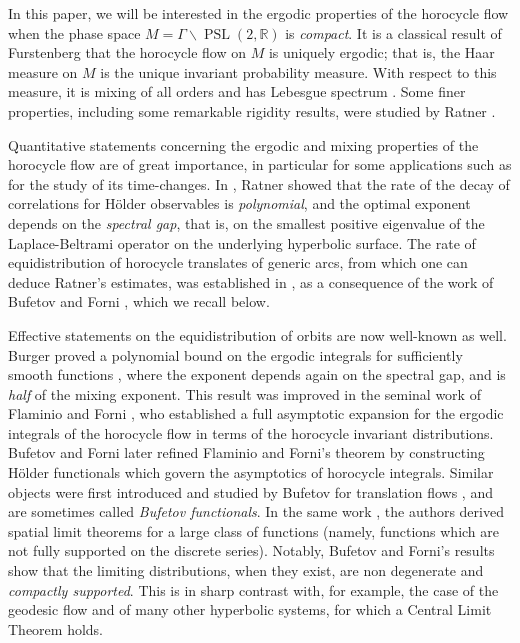 \documentclass[10pt]{amsart}
\newcommand \R{\mathbb{R}}
\DeclareMathOperator{\PSL}{PSL}
\theoremstyle{definition}
\begin{document}
In this paper, we will be interested in the ergodic properties of the horocycle flow when the phase space $M = \Gamma \backslash \PSL(2,\R)$ is \emph{compact}.
It is a classical result of Furstenberg \cite{Fur} that the horocycle flow on $M$ is uniquely ergodic; that is, the Haar measure on $M$ is the unique invariant probability measure.
With respect to this measure, it is mixing of all orders \cite{Mar} and has Lebesgue spectrum \cite{GeFo, Par}.
Some finer properties, including some remarkable rigidity results, were studied by Ratner \cite{Rat2, Rat4, Rat3}.

Quantitative statements concerning the ergodic and mixing properties of the horocycle flow are of great importance, in particular for some applications such as for the study of its time-changes.
In \cite{Rat1}, Ratner showed that the rate of the decay of correlations for Hölder observables is \emph{polynomial}, and the optimal exponent depends on the \emph{spectral gap}, that is, on the smallest positive eigenvalue of the Laplace-Beltrami operator on the underlying hyperbolic surface. The rate of equidistribution of horocycle translates of generic arcs, from which one can deduce Ratner's estimates, was established in \cite{Rav}, as a consequence of the work of Bufetov and Forni \cite{BuFo}, which we recall below.

Effective statements on the equidistribution of orbits are now well-known as well.
Burger proved a polynomial bound on the ergodic integrals for sufficiently smooth functions \cite{Bur}, where the exponent depends again on the spectral gap, and is \emph{half} of the mixing exponent.
This result was improved in the seminal work of Flaminio and Forni \cite{FlaFo}, who established a full asymptotic expansion for the ergodic integrals of the horocycle flow in terms of the horocycle invariant distributions.
Bufetov and Forni \cite{BuFo} later refined Flaminio and Forni's theorem by constructing Hölder functionals which govern the asymptotics of horocycle integrals.
Similar objects were first introduced and studied by Bufetov for translation flows \cite{Buf}, and are sometimes called \emph{Bufetov functionals}.
In the same work \cite{BuFo}, the authors derived spatial limit theorems for a large class of functions (namely, functions which are not fully supported on the discrete series).
Notably, Bufetov and Forni's results show that the limiting distributions, when they exist, are non degenerate and \emph{compactly supported}. This is in sharp contrast with, for example, the case of the geodesic flow and of many other hyperbolic systems, for which a Central Limit Theorem holds.
\end{document}
